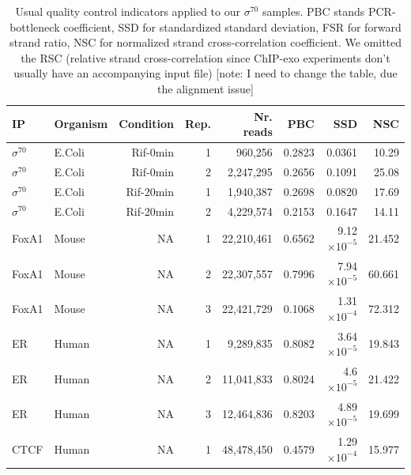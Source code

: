 \documentclass{bmcart}\usepackage[]{graphicx}\usepackage[]{color}
\newcommand{\sig}{\sigma^{70}}
\begin{document}
\begin{table}[h]
  \centering
\begin{tabular}{l|l|r|r|r|r|r|r}
\hline\hline
IP & Organism  &Condition & Rep. & Nr. reads & PBC & SSD &  NSC  \\
\hline\hline
$\sig$ & E.Coli & Rif-0min & 1 & 960,256 & 0.2823 & 0.0361 &  10.29 \\
\hline
$\sig$ &  E.Coli & Rif-0min & 2 & 2,247,295 & 0.2656 & 0.1091  &  25.08  \\
\hline
$\sig$ &  E.Coli & Rif-20min & 1 & 1,940,387 & 0.2698 & 0.0820  & 17.69  \\
\hline
$\sig$ &  E.Coli & Rif-20min & 2 & 4,229,574 & 0.2153 & 0.1647  &  14.11 \\
\hline
FoxA1 &  Mouse &  NA & 1 & 22,210,461 & 0.6562 & 9.12 $\times 10^{-5}$ & 21.452 \\
\hline
FoxA1 &  Mouse &  NA & 2 & 22,307,557 & 0.7996 & 7.94 $\times 10^{-5}$ & 60.661 \\
\hline
FoxA1 &  Mouse &  NA & 3 & 22,421,729 & 0.1068 & 1.31 $\times 10^{-4}$ & 72.312 \\
\hline
ER & Human & NA & 1 & 9,289,835 & 0.8082 & 3.64 $\times 10^{-5}$ & 19.843 \\
\hline
ER & Human & NA & 2 & 11,041,833 & 0.8024 & 4.6 $\times 10^{-5}$ & 21.422 \\
\hline
ER & Human & NA & 3 & 12,464,836 & 0.8203 & 4.89 $\times 10^{-5}$ & 19.699 \\
\hline
CTCF & Human & NA & 1 &   48,478,450 & 0.4579 & 1.29 $\times 10^{-4}$ & 15.977 \\
\hline
\end{tabular}  
\caption{Usual quality control indicators applied to our
  $\sigma^{70}$ samples. PBC stands PCR-bottleneck coefficient, SSD
  for standardized standard deviation, FSR for forward strand ratio,
  NSC for normalized strand cross-correlation coefficient. We
  omitted the RSC (relative strand cross-correlation since ChIP-exo
  experiments don't usually have an accompanying input file) 
  [note: I need to change the table, due the alignment issue]}

  \label{tab:qcbase}
\end{table}
\end{document}
